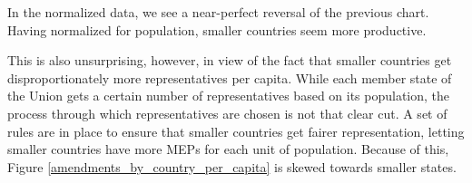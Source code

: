 \documentclass[lettersize,journal]{IEEEtran}
\begin{document}
In the normalized data, we see a near-perfect reversal of the previous chart. Having normalized for population, smaller countries seem more productive.

This is also unsurprising, however, in view of the fact that smaller countries get disproportionately more representatives per capita. While each member state of the Union gets a certain number of representatives based on its population, the process through which representatives are chosen is not that clear cut. A set of rules are in place to ensure that smaller countries get fairer representation, letting smaller countries have more MEPs for each unit of population. Because of this, Figure \ref{amendments_by_country_per_capita} is skewed towards smaller states.


\end{document}
